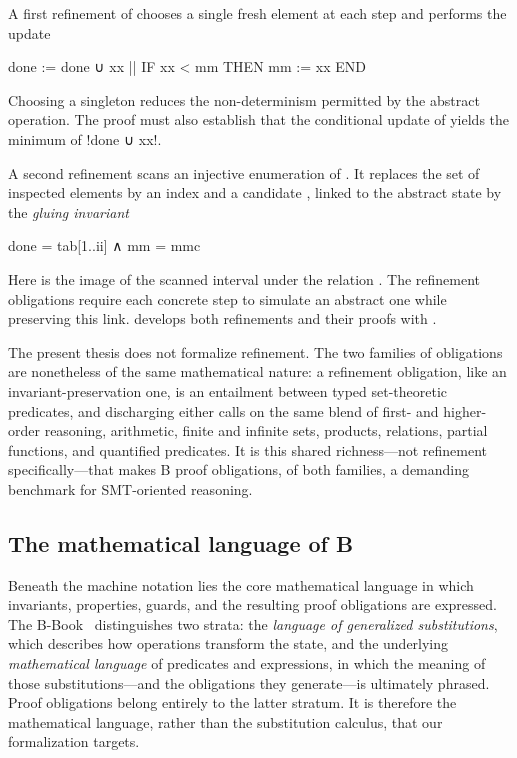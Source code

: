 \begin{example}
\label{ex:minsearch-ref}
A first refinement of  chooses a single fresh element
 at each step and performs the update
\begin{blisting}
done := done ∪ {xx} || IF xx < mm THEN mm := xx END
\end{blisting}
Choosing a singleton reduces the non-determinism permitted by the abstract operation.
The proof must also establish that the conditional update of  yields the
minimum of \binl!done ∪ {xx}!.

A second refinement scans an injective enumeration  of .
It replaces the set of inspected elements by an index  and a candidate
, linked to the abstract state by the \emph{gluing invariant}
\begin{blisting}
done = tab[1..ii] ∧ mm = mmc
\end{blisting}
Here  is the image of the scanned interval under the relation
. The refinement obligations require each concrete step to simulate an
abstract one while preserving this link.
 develops both refinements and their proofs with \barrel{}.
\end{example}

The present thesis does not formalize refinement.
The two families of obligations are nonetheless of the same mathematical nature: a refinement obligation, like an invariant-preservation one, is an entailment between typed set-theoretic predicates, and discharging either calls on the same blend of first- and higher-order reasoning, arithmetic, finite and infinite sets, products, relations, partial functions, and quantified predicates.
It is this shared richness---not refinement specifically---that makes B proof obligations, of both families, a demanding benchmark for SMT-oriented reasoning.

\subsection{The mathematical language of B}
\label{subsec:b-mathematical-language}

Beneath the machine notation lies the core mathematical language in which
invariants, properties, guards, and the resulting proof obligations are
expressed.
The B-Book~\cite{abrial1996bbook} distinguishes two strata: the \emph{language
  of generalized substitutions}, which describes how operations transform the
state, and the underlying \emph{mathematical language} of predicates and
expressions, in which the meaning of those substitutions---and the obligations
they generate---is ultimately phrased.
Proof obligations belong entirely to the latter stratum.
It is therefore the mathematical language, rather than the substitution
calculus, that our formalization targets.

